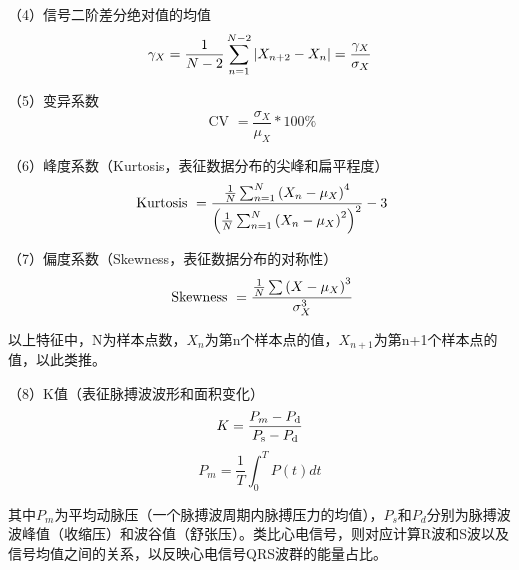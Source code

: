 （4）信号二阶差分绝对值的均值
\vspace{-1ex}
\begin{equation}
    \label{equ:Gamma}
    \gamma_{X}=\frac{1}{N-2} \sum_{n=1}^{N-2}\left|X_{n+2}-X_{n}\right|=\frac{\gamma_{X}}{\sigma_{X}}
    \vspace{-1ex}
\end{equation}

（5）变异系数
\begin{equation}
    \label{equ:Sigma}
    \text { CV }=\frac{\sigma_{X}}{\mu_{X}} * 100 \%
\end{equation}

（6）峰度系数（Kurtosis，表征数据分布的尖峰和扁平程度）
\vspace{-1ex}
\begin{equation}
    \label{equ:Kurtosis}
    \text { Kurtosis }=\frac{\frac{1}{N} \sum_{n=1}^{N}\left(X_{n}-\mu_{X}\right)^{4}}{\left(\frac{1}{N} \sum_{n=1}^{N}\left(X_{n}-\mu_{X}\right)^{2}\right)^{2}}-3
    \vspace{-1ex}
\end{equation}

（7）偏度系数（Skewness，表征数据分布的对称性）
\vspace{-1ex}
\begin{equation}
    \label{equ:Skewness}
    \text { Skewness }=\frac{\frac{1}{N} \sum\left(X-\mu_{X}\right)^{3}}{\sigma_{X}^{3}}
    \vspace{-1ex}
\end{equation}

以上特征中，N为样本点数，$X_n$为第n个样本点的值，$X_{n+1}$为第n+1个样本点的值，以此类推。

（8）K值（表征脉搏波波形和面积变化）\cite{罗志昌1996脉搏波波形特征信息的研究}
\vspace{-1ex}
\begin{equation}
    \label{equ:K-value}
    K=\displaystyle{\frac{P_{m}-P_{\mathrm{d}}}{P_{\mathrm{s}}-P_{\mathrm{d}}}}
    \vspace{-4ex}
\end{equation}
\begin{equation}
    \label{equ:K-value}
    P_{m}=\frac{1}{T} \int_{0}^{T} P(t) d t
\end{equation}

其中$P_m$为平均动脉压（一个脉搏波周期内脉搏压力的均值），$P_s$和$P_d$分别为脉搏波波峰值（收缩压）和波谷值（舒张压）。类比心电信号，则对应计算R波和S波以及信号均值之间的关系，以反映心电信号QRS波群的能量占比\cite{陈沙利2021}。

